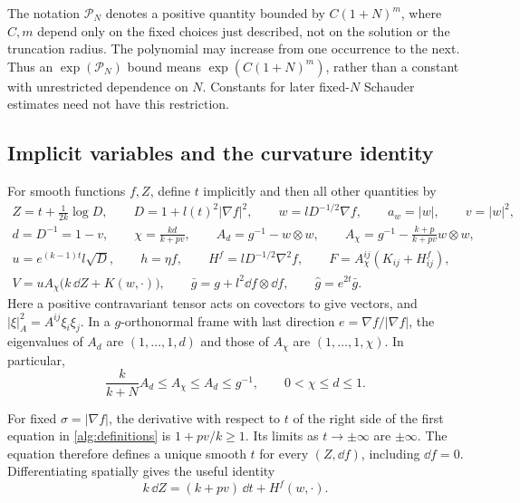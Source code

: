 The notation $\mathcal P_N$ denotes a positive quantity bounded by
$C(1+N)^m$, where $C,m$ depend only on the fixed choices just described,
not on the solution or the truncation radius.  The polynomial may
increase from one occurrence to the next.  Thus an
$\exp(\mathcal P_N)$ bound means $\exp(C(1+N)^m)$, rather than a
constant with unrestricted dependence on $N$.  Constants for later
fixed-$N$ Schauder estimates need not have this restriction.

\subsection{Implicit variables and the curvature identity}

For smooth functions $f,Z$, define $t$ implicitly and then all other
quantities by
\begin{equation}
\begin{gathered}
 Z=t+\frac{1}{2k}\log D,\qquad D=1+l(t)^2|\nabla f|^2,
 \qquad w=lD^{-1/2}\nabla f,\qquad a_w=|w|,\qquad v=|w|^2,
 \\
 d=D^{-1}=1-v,\qquad \chi=\frac{kd}{k+pv},\qquad
 A_d=g^{-1}-w\otimes w,\qquad
 A_\chi=g^{-1}-\frac{k+p}{k+pv}w\otimes w,
 \\
 u=e^{(k-1)t}l\sqrt D,\qquad h=\eta f,\qquad
 H^f=lD^{-1/2}\nabla^2f,\qquad
 F=A_\chi^{ij}(K_{ij}+H^f_{ij}),
 \\
 V=uA_\chi\bigl(k\,\dd Z+K(w,\cdot)\bigr),\qquad
 \bar g=g+l^2\dd f\otimes\dd f,\qquad
 \widehat g=e^{2t}\bar g .
\end{gathered}
\label{alg:definitions}
\end{equation}
Here a positive contravariant tensor acts on covectors to give vectors,
and $|\xi|_A^2=A^{ij}\xi_i\xi_j$.  In a $g$-orthonormal frame with
last direction $e=\nabla f/|\nabla f|$, the eigenvalues of $A_d$ are
$(1,\ldots,1,d)$ and those of $A_\chi$ are
$(1,\ldots,1,\chi)$.  In particular,
\begin{equation}
 \frac{k}{k+N}A_d\leq A_\chi\leq A_d\leq g^{-1},
 \qquad 0<\chi\leq d\leq1.
 \label{alg:tensor-comparison}
\end{equation}

For fixed $\sigma=|\nabla f|$, the derivative with respect to $t$ of
the right side of the first equation in \eqref{alg:definitions} is
$1+pv/k\geq1$.  Its limits as $t\to\pm\infty$ are $\pm\infty$.
The equation therefore defines a unique smooth $t$ for every $(Z,\dd f)$,
including $\dd f=0$.  Differentiating spatially gives the useful identity
\begin{equation}
 k\,\dd Z=(k+pv)\,\dd t+H^f(w,\cdot).
 \label{alg:implicit-differential}
\end{equation}

